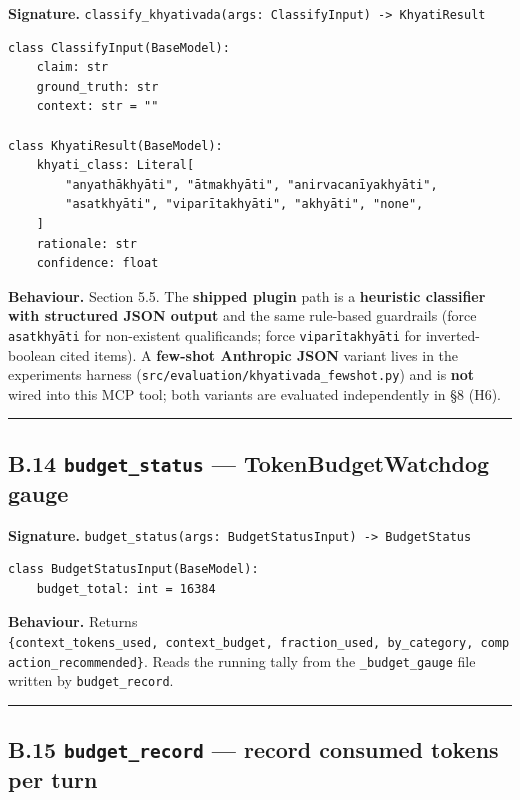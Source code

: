 \textbf{Signature.} \texttt{classify\_khyativada(args:\ ClassifyInput)\ -\textgreater{}\ KhyatiResult}

\begin{verbatim}
class ClassifyInput(BaseModel):
    claim: str
    ground_truth: str
    context: str = ""

class KhyatiResult(BaseModel):
    khyati_class: Literal[
        "anyathākhyāti", "ātmakhyāti", "anirvacanīyakhyāti",
        "asatkhyāti", "viparītakhyāti", "akhyāti", "none",
    ]
    rationale: str
    confidence: float
\end{verbatim}

\textbf{Behaviour.} Section 5.5. The \textbf{shipped plugin} path is a \textbf{heuristic classifier with structured JSON output} and the same rule-based guardrails (force \texttt{asatkhyāti} for non-existent qualificands; force \texttt{viparītakhyāti} for inverted-boolean cited items). A \textbf{few-shot Anthropic JSON} variant lives in the experiments harness (\texttt{src/evaluation/khyativada\_fewshot.py}) and is \textbf{not} wired into this MCP tool; both variants are evaluated independently in §8 (H6).

\begin{center}\rule{0.5\linewidth}{0.5pt}\end{center}

\subsection{\texorpdfstring{B.14 \texttt{budget\_status} --- TokenBudgetWatchdog gauge}{B.14 budget\_status --- TokenBudgetWatchdog gauge}}\label{b.14-budget_status-tokenbudgetwatchdog-gauge}

\textbf{Signature.} \texttt{budget\_status(args:\ BudgetStatusInput)\ -\textgreater{}\ BudgetStatus}

\begin{verbatim}
class BudgetStatusInput(BaseModel):
    budget_total: int = 16384
\end{verbatim}

\textbf{Behaviour.} Returns \texttt{\{context\_tokens\_used,\ context\_budget,\ fraction\_used,\ by\_category,\ compaction\_recommended\}}. Reads the running tally from the \texttt{\_budget\_gauge} file written by \texttt{budget\_record}.

\begin{center}\rule{0.5\linewidth}{0.5pt}\end{center}

\subsection{\texorpdfstring{B.15 \texttt{budget\_record} --- record consumed tokens per turn}{B.15 budget\_record --- record consumed tokens per turn}}\label{b.15-budget_record-record-consumed-tokens-per-turn}


